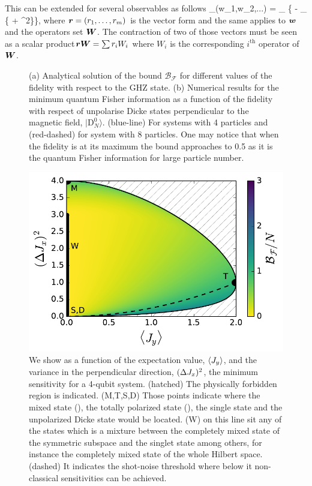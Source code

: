 This can be extended for several observables as follows
\be
  _{}(w_1,w_2,...) = \sup_{} \big\{  - \sup_{\ket{\psi}} \{ + ^2\}\big\},
\ee
where $\boldsymbol{r}=(r_1,\dots,r_m)$ is the vector form and the same applies to $\boldsymbol{w}$ and the operators set $\boldsymbol{W}$.
The contraction of two of those vectors must be seen as a scalar product\ie $\boldsymbol{rW}=\sum r_iW_i$ where $W_i$ is the corresponding $i^{\text{th}}$ operator of $\boldsymbol{W}$.

\begin{figure}
  \centering
  \caption{(a) Analytical solution of the bound $\mathcal{B}_{\mathcal{F}}$ for different values of the fidelity with respect to the GHZ state. (b) Numerical results for the minimum quantum Fisher information as a function of the fidelity with respect of unpolarise Dicke states perpendicular to the magnetic field, $|\text{D}_N^0\rangle$. (blue-line) For systems with 4 particles and (red-dashed) for system with 8 particles. One may notice that when the fidelity is at its maximum the bound approaches to 0.5 as it is the quantum Fisher information for large particle number.}
  \label{fig:vd-secuence-evo}
\end{figure}

\begin{figure}
  \centering
  \includegraphics[scale=.65]{img/plots/LT_spsq2d_4.pdf}
  \caption{We show as a function of the expectation value, $\langle J_y \rangle$, and the variance in the perpendicular direction, $(\Delta J_x )^2$, the minimum sensitivity for a 4-qubit system.
  (hatched) The physically forbidden region is indicated. (M,T,S,D) Those points indicate where the mixed state (), the totally polarized state (), the single state and the unpolarized Dicke state would be located. (W) on this line sit any of the states which is a mixture between the completely mixed state of the symmetric subspace and the singlet state among others, for instance the completely mixed state of the whole Hilbert space. (dashed) It indicates the shot-noise threshold where below it non-classical sensitivities can be achieved.}
  \label{fig:lt-spsq2d-4}
\end{figure}

